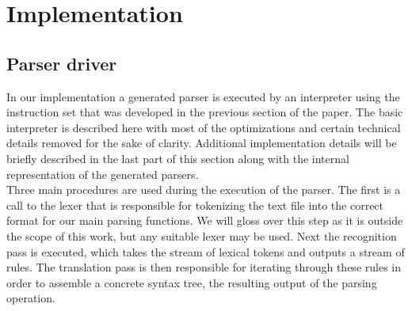 \documentclass[envcountsame,runningheads]{llncs}
\begin{document}




\section{Implementation}
\subsection{Parser driver}

In our implementation a generated parser is executed by an interpreter using the instruction set that was developed in the previous section of the paper.
The basic interpreter is described here with most of the optimizations and certain technical details removed for the sake of clarity. 
Additional implementation details will be briefly described in the last part of this section along with the internal representation of the generated parsers.\\
Three main procedures are used during the execution of the parser. 
The first is a call to the lexer that is responsible for tokenizing the text file into the correct format for our main parsing functions.
We will gloss over this step as it is outside the scope of this work, but any suitable lexer may be used.
Next the recognition pass is executed, which takes the stream of lexical tokens and outputs a stream of rules. 
The translation pass is then responsible for iterating through these rules in order to assemble a concrete syntax tree, the resulting output of the parsing operation.
\end{document}
